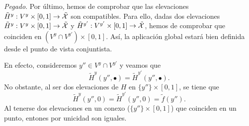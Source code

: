 \begin{itemize}
\emph{Pegado}. Por último, hemos de comprobar que las elevaciones $\tilde{H}^y:V^y\times[0,1]\to \tilde{\mathcal{X}}$ son compatibles. Para ello, dadas dos elevaciones $\tilde{H}^y:V^y\times[0,1]\to \tilde{\mathcal{X}}$ y $\tilde{H}^{y'}:V^{y'}\times[0,1]\to \tilde{\mathcal{X}}$, hemos de comprobar que coinciden en $(V^y\cap V^{y'})\times[0,1]$. Así, la aplicación global estará bien definida desde el punto de vista conjuntista. 

En efecto, consideremos $y''\in V^y\cap V^{y'}$ y veamos que 
\[\tilde{H}^y(y'',\bullet)=\tilde{H}^{y'}(y'',\bullet).\]
No obstante, al ser dos elevaciones de $H$ en $\{y''\}\times[0,1]$, se tiene que 
\[\tilde{H}^y(y'',0)=\tilde{H}^{y'}(y'',0)=\tilde{f}(y'').\]
Al tenerse dos elevaciones en un conexo ($\{y''\}\times[0,1]$) que coinciden en un punto, entones por unicidad son iguales. 
\end{itemize}
